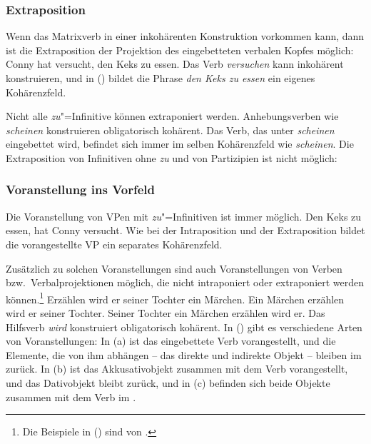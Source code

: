 \subsubsection{Extraposition}

Wenn das Matrixverb in einer inkohärenten Konstruktion vorkommen kann,
dann ist die Extraposition der Projektion des eingebetteten verbalen Kopfes möglich:
\ea
Conny hat versucht, den Keks zu essen.
\z
Das Verb \emph{versuchen} kann inkohärent konstruieren, und in () 
bildet die Phrase \emph{den Keks zu essen} ein eigenes Kohärenzfeld.

Nicht alle \emph{zu}"=Infinitive können extraponiert werden. Anhebungsverben
wie \emph{scheinen} konstruieren obligatorisch kohärent.
Das Verb, das unter \emph{scheinen} eingebettet wird, befindet sich immer
im selben Kohärenzfeld wie \emph{scheinen}.
\eal
{}
\zl
Die Extraposition von Infinitiven ohne \emph{zu} und von Partizipien
ist nicht möglich:
\eal
{}
\zl
{}

\subsubsection{Voranstellung ins Vorfeld}
\label{sec-verb-fronting}

Die Voranstellung von VPen mit \emph{zu}"=Infinitiven ist immer möglich.
\ea
Den Keks zu essen, hat Conny versucht.
\z
Wie bei der Intraposition und der Extraposition bildet die vorangestellte
VP ein separates Kohärenzfeld.

Zusätzlich zu solchen Voranstellungen sind auch Voranstellungen von Verben
bzw.\ Verbalprojektionen möglich, die nicht intraponiert oder extraponiert werden können.\footnote{
        Die Beispiele in () sind von \citet*[--721]{Haftka81a}.
}
\eal
\label{bsp-erzaehlen-wird}
\ex
Erzählen wird er seiner Tochter ein Märchen.
\ex
Ein Märchen erzählen wird er seiner Tochter.
\ex  
Seiner Tochter ein Märchen erzählen wird er.
\zl
Das Hilfsverb \emph{wird} konstruiert obligatorisch kohärent.
In () gibt es verschiedene Arten von Voranstellungen:
In (a) ist das eingebettete Verb vorangestellt, und die Elemente, die
von ihm abhängen -- das direkte und indirekte Objekt -- bleiben im \mf zurück.
In (b) ist das Akkusativobjekt zusammen mit dem Verb vorangestellt,
und das Dativobjekt bleibt zurück, und in (c) befinden sich beide Objekte
zusammen mit dem Verb im \vf.

